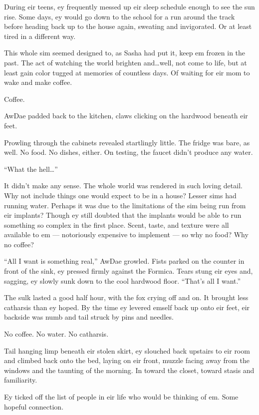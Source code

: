 During eir teens, ey frequently messed up eir sleep schedule enough to see the sun rise. Some days, ey would go down to the school for a run around the track before heading back up to the house again, sweating and invigorated. Or at least tired in a different way.

This whole sim seemed designed to, as Sasha had put it, keep em frozen in the past. The act of watching the world brighten and\ldots{}well, not come to life, but at least gain color tugged at memories of countless days. Of waiting for eir mom to wake and make coffee.

Coffee.

AwDae padded back to the kitchen, claws clicking on the hardwood beneath eir feet.

Prowling through the cabinets revealed startlingly little. The fridge was bare, as well. No food. No dishes, either. On testing, the faucet didn't produce any water.

``What the hell\ldots{}''

It didn't make any sense. The whole world was rendered in such loving detail. Why not include things one would expect to be in a house? Lesser sims had running water. Perhaps it was due to the limitations of the sim being run from eir implants? Though ey still doubted that the implants would be able to run something so complex in the first place. Scent, taste, and texture were all available to em — notoriously expensive to implement — so why no food? Why no coffee?

``All I want is something real,'' AwDae growled. Fists parked on the counter in front of the sink, ey pressed firmly against the Formica. Tears stung eir eyes and, sagging, ey slowly sunk down to the cool hardwood floor. ``That's all I want.''

The sulk lasted a good half hour, with the fox crying off and on. It brought less catharsis than ey hoped. By the time ey levered emself back up onto eir feet, eir backside was numb and tail struck by pins and needles.

No coffee. No water. No catharsis.

Tail hanging limp beneath eir stolen skirt, ey slouched back upstairs to eir room and climbed back onto the bed, laying on eir front, muzzle facing away from the windows and the taunting of the morning. In toward the closet, toward stasis and familiarity.

Ey ticked off the list of people in eir life who would be thinking of em. Some hopeful connection.

